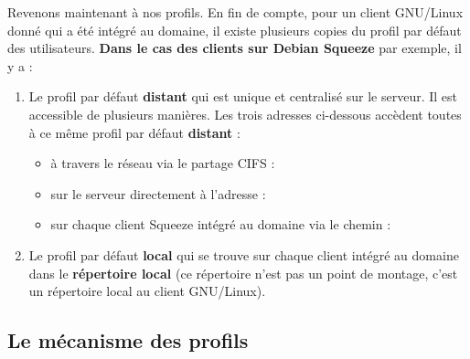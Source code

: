 Revenons maintenant à nos profils. En fin de compte, pour un client GNU/Linux donné
qui a été intégré au domaine, il existe plusieurs copies du profil par défaut des
utilisateurs. \textbf{Dans le cas des clients sur Debian Squeeze} par exemple, il y a :
%
\begin{enumerate}

\item Le profil par défaut \textbf{distant} qui est unique
et centralisé sur le serveur. Il est
accessible de plusieurs manières. Les trois \og adresses \fg ci-dessous accèdent
toutes à ce même profil par défaut \textbf{distant} :

\begin{itemize}

\item à travers le réseau via le partage CIFS :
\begin{flushright}
\hspace*{10em}
\end{flushright}

\item sur le serveur directement à l'adresse :
\begin{flushright}
\hspace*{10em}
\end{flushright}

\item sur chaque client Squeeze intégré au domaine via le chemin :
\begin{flushright}
\hspace*{10em}
\end{flushright}

\end{itemize}

\item Le profil par défaut \textbf{local} qui se trouve sur chaque client intégré au domaine
dans le \textbf{répertoire local}  (ce répertoire n'est pas
un point de montage, c'est un répertoire local au client GNU/Linux).

\end{enumerate}




\subsection{Le mécanisme des profils}
\label{mecanisme-profils}

